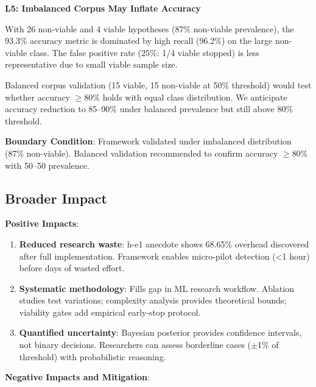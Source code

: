 \textbf{L5: Imbalanced Corpus May Inflate Accuracy}

With 26 non-viable and 4 viable hypotheses (87\% non-viable prevalence), the 93.3\% accuracy metric is dominated by high recall (96.2\%) on the large non-viable class. The false positive rate (25\%: 1/4 viable stopped) is less representative due to small viable sample size.

Balanced corpus validation (15 viable, 15 non-viable at 50\% threshold) would test whether accuracy $\geq$80\% holds with equal class distribution. We anticipate accuracy reduction to 85--90\% under balanced prevalence but still above 80\% threshold.

\textbf{Boundary Condition}: Framework validated under imbalanced distribution (87\% non-viable). Balanced validation recommended to confirm accuracy $\geq$80\% with 50--50 prevalence.

\subsection{Broader Impact}

\textbf{Positive Impacts}:

\begin{enumerate}
\item \textbf{Reduced research waste}: h-e1 anecdote shows 68.65\% overhead discovered after full implementation. Framework enables micro-pilot detection (<1 hour) before days of wasted effort.

\item \textbf{Systematic methodology}: Fills gap in ML research workflow. Ablation studies test variations; complexity analysis provides theoretical bounds; viability gates add empirical early-stop protocol.

\item \textbf{Quantified uncertainty}: Bayesian posterior provides confidence intervals, not binary decisions. Researchers can assess borderline cases ($\pm$1\% of threshold) with probabilistic reasoning.
\end{enumerate}

\textbf{Negative Impacts and Mitigation}:

